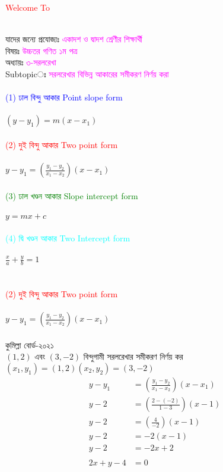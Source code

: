 \documentclass{article}
\begin{document}
 
	\Large
	\textcolor{red}{Welcome To} 
	\\
	\\
	যাদের জন্যে প্রযোজ্যঃ  	\textcolor{magenta}{একাদশ ও দ্বাদশ শ্রেণীর শিক্ষার্থী} \\
	বিষয়ঃ \textcolor{magenta}{উচ্চতর গণিত ১ম পত্র} \\
	অধ্যায়ঃ \textcolor{magenta}{৩-সরলরেখা}\\ 
	Subtopicঃ  \textcolor{magenta}{  সরলরেখার বিভিন্ন আকারের সমীকরণ নির্ণয় করা   }\\
	\\
	\textcolor{blue}{(1)	ঢাল বিন্দু আকার Point slope form}\\
	\\
	$(y-y_1)=m(x-x_1)$\\
	\\
	\textcolor{red} {(2)  দুই বিন্দু আকার 	Two point form}\\
	\\
	$y-y_1=\left(\frac{y_1-y_2}{x_1-x_2}\right)(x-x_1)$\\
	\\
	\textcolor{green}{ (3) ঢাল খণ্ডন আকার 	Slope intercept form}\\
	\\
	$y=mx+c$\\
	\\
	\textcolor{cyan}{ (4) দ্বি খণ্ডন আকার  Two	Intercept form}\\
	\\
	$\frac{x}{a}+\frac{y}{b}=1$\\
	\\
\vspace{6cm}
\\
\textcolor{red} {(2)  দুই বিন্দু আকার 	Two point form}\\
\\
$y-y_1=\left(\frac{y_1-y_2}{x_1-x_2}\right)(x-x_1)$\\
\\
	কুমিল্লা বোর্ড-২০২১\\
	$(1,2)$ এবং  $(3,-2)$ বিন্দুগামী  সরলরেখার সমীকরণ নির্ণয় কর \\
	$(x_1,y_1)=(1,2)$\qquad $(x_2,y_2)=(3,-2)$\\ 
	\begin{align*}
y-y_1&=\left(\frac{y_1-y_2}{x_1-x_2}\right)(x-x_1)\\
y-2&=\left(\frac{2-(-2)}{1-3}\right)(x-1)\\
y-2&=\left(\frac{4}{-2}\right)(x-1)\\
		y-2&=-2(x-1)\\
		y-2&=-2x+2\\
		\\
		2x+y-4&=0	
	\end{align*}
\end{document}
